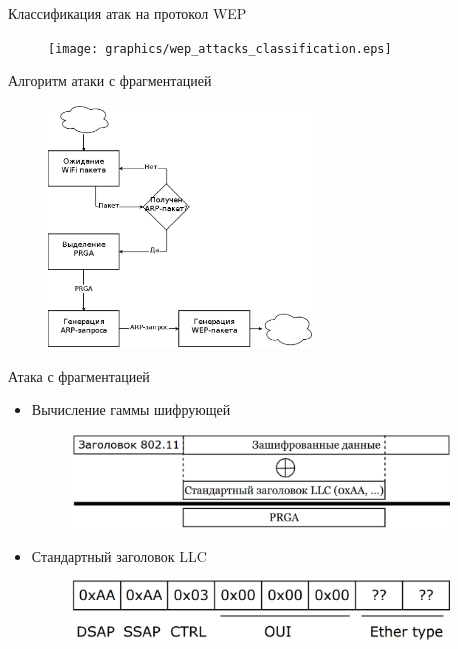 \documentclass[12pt]{beamer}
\begin{document}
\begin{frame}{Классификация атак на протокол WEP}

    \begin{figure}
        \texttt{[image: graphics/wep\_attacks\_classification.eps]}
    \end{figure}

\end{frame} 


\begin{frame}{Алгоритм атаки с фрагментацией}

    \begin{figure}
        \includegraphics[width=7cm]{graphics/fragment_program_algo.eps}
    \end{figure}

\end{frame} 


\begin{frame}{Атака с фрагментацией}

    \begin{itemize}

        \item Вычисление гаммы шифрующей
            \begin{figure}
                \includegraphics[width=10cm]{graphics/restore_part_of_gamma.eps}
            \end{figure}

        \item Стандартный заголовок LLC
            \begin{figure}
                \includegraphics[width=10cm]{graphics/default_llc_header.eps}
            \end{figure}
    \end{itemize}

\end{frame} 
\end{document}
